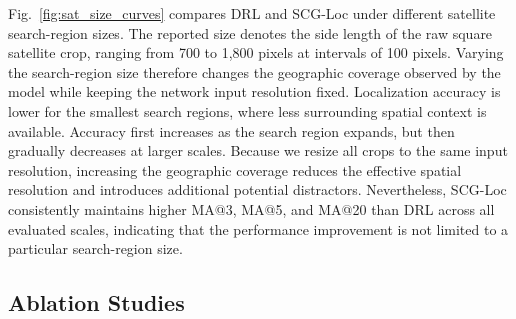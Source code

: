 \documentclass[runningheads]{llncs}
\begin{document}
Fig.~\ref{fig:sat_size_curves} compares DRL and SCG-Loc under different satellite search-region sizes. The reported size denotes the side length of the raw square satellite crop, ranging from 700 to 1,800 pixels at intervals of 100 pixels. Varying the search-region size therefore changes the geographic coverage observed by the model while keeping the network input resolution fixed. Localization accuracy is lower for the smallest search regions, where less surrounding spatial context is available. Accuracy first increases as the search region expands, but then gradually decreases at larger scales. Because we resize all crops to the same input resolution, increasing the geographic coverage reduces the effective spatial resolution and introduces additional potential distractors. Nevertheless, SCG-Loc consistently maintains higher MA@3, MA@5, and MA@20 than DRL across all evaluated scales, indicating that the performance improvement is not limited to a particular search-region size.

\subsection{Ablation Studies}
\label{subsec:ablation}
\end{document}
